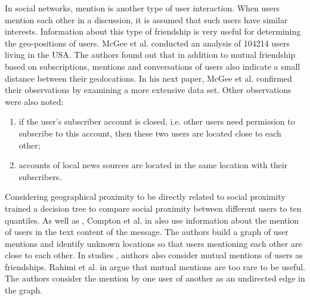 In social networks, mention is another type of user interaction. When users mention each other in a discussion, it is assumed that such users have similar interests. Information about this type of friendship is very useful for determining the geo-positions of users. McGee et al. \cite{McGeeCaverleeCheng} conducted an analysis of 104214 users living in the USA. The authors found out that in addition to mutual friendship based on subscriptions, mentions and conversations of users also indicate a small distance between their geolocations. In his next paper, McGee et al. \cite{McGeeCaverleeCheng2013} confirmed their observations by examining a more extensive data set. Other observations were also noted:
\begin{enumerate}
	\item if the user's subscriber account is closed, i.e. other users need permission to subscribe to this account, then these two users are located close to each other;
	\item accounts of local news sources are located in the same location with their subscribers.
\end{enumerate}

Considering geographical proximity to be directly related to social proximity \cite{McGeeCaverleeCheng2013} trained a decision tree to compare social proximity between different users to ten quantiles. As well as \cite{McGeeCaverleeCheng,McGeeCaverleeCheng2013}, Compton et al. in \cite{ComptonJurgensAllen} also use information about the mention of users in the text content of the message. The authors build a graph of user mentions and identify unknown locations so that users mentioning each other are close to each other. In studies \cite{Jurgens}, authors also consider mutual mentions of users as friendships. Rahimi et al. in \cite{RahimiCohnBaldwin} argue that mutual mentions are too rare to be useful. The authors consider the mention by one user of another as an undirected edge in the graph.

